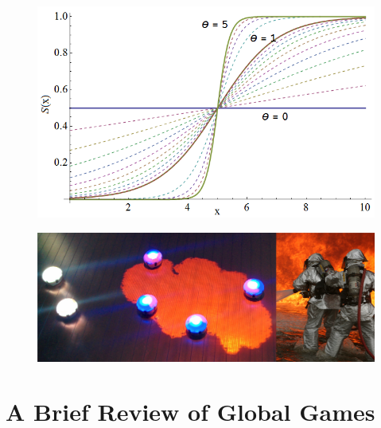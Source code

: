 \documentclass[conference]{IEEETran}
\begin{document}
\begin{figure}[!ht]
\centering\includegraphics[width=\columnwidth]{../figures/sigmoid1.png}
\centering\caption{}\label{fig:sigmoid}
\end{figure}

\begin{figure}[!ht]
\centering\includegraphics[width=\textwidth]{../figures/dropletfire.png}
\centering\caption{}\label{fig:dropletfire}
\end{figure}

\section{A Brief Review of Global Games}
\end{document}
